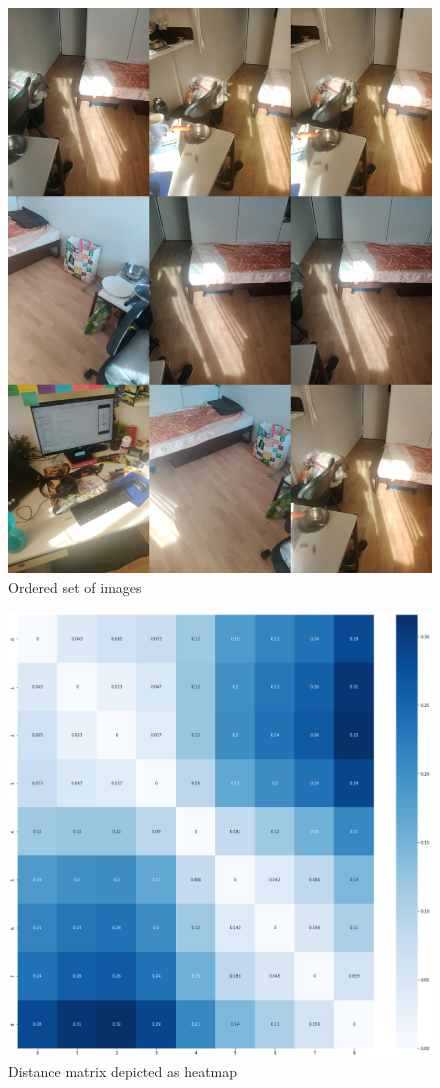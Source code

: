     \begin{figure}
    	\centering
    	\includegraphics[width=12cm]{images/ordered_images.jpg}
    	\caption{Ordered set of images}
    	\label{fig:ordered set of images}
    \end{figure}
	
    \begin{figure}
		\centering
		\includegraphics[width=12cm]{images/ordered_D.png}
		\caption{Distance matrix depicted as heatmap}
		\label{fig:ordered set D}
	\end{figure}  
    
